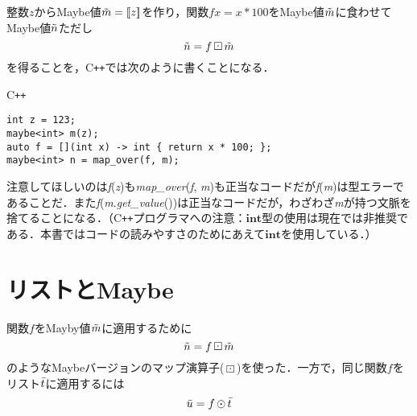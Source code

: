 \documentclass[a5paper,draft]{jsbook}
\def\[{\left[\!\left[}
\def\]{\right]\!\right]}
\newcommand{\programminglanguage}[1]{\textsf{#1}}
\newcommand{\cxx}{\programminglanguage{C}\texttt{++}}
\newenvironment{cxxcode}{\begin{itembox}[r]{\cxx}}{\end{itembox}}
\newcommand{\pthnClassname}[1]{\textrm{#1}}
\newcommand{\pthnId}[1]{\textit{#1}}
\newcommand{\pthnKeyword}[1]{\textbf{#1}}
\newcommand{\pthnOp}[1]{\texttt{#1}}
\newcommand{\mathListVar}[1]{\Bar{#1}}
\DeclareMathOperator{\hsklMap}{\odot}
\DeclareMathOperator{\hsklMaybeMap}{\boxdot}
\newcommand{\hsklJust}[1]{\[#1\]}
\newcommand{\hsklMaybe}[1]{\Tilde{#1}}
\begin{document}
整数$z$からMaybe値$\hsklMaybe{m}=\hsklJust{z}$を作り，関数$fx=x*100$をMaybe値$\hsklMaybe{m}$に食わせてMaybe値$\hsklMaybe{n}$ただし$$\hsklMaybe{n}=f\hsklMaybeMap\hsklMaybe{m}$$を得ることを，\cxx では次のように書くことになる．
\begin{cxxcode}
\begin{verbatim}
int z = 123;
maybe<int> m(z);
auto f = [](int x) -> int { return x * 100; };
maybe<int> n = map_over(f, m);
\end{verbatim}
\end{cxxcode}
注意してほしいのは\pthnId{f}(\pthnId{z})も\pthnId{map\_over}(\pthnId{f}, \pthnId{m})も正当なコードだが\pthnId{f}(\pthnId{m})は型エラーであることだ．また\pthnId{f}(\pthnId{m}.\pthnId{get\_value}())は正当なコードだが，わざわざ\pthnId{m}が持つ文脈を捨てることになる．（\cxx プログラマへの注意：$\pthnKeyword{int}$型の使用は現在では非推奨である．本書ではコードの読みやすさのためにあえて$\pthnKeyword{int}$を使用している．）


\section{リストとMaybe}

関数$f$をMayby値$\hsklMaybe{m}$に適用するために$$\hsklMaybe{n}=f\hsklMaybeMap\hsklMaybe{m}$$のようなMaybeバージョンのマップ演算子($\hsklMaybeMap$)を使った．一方で，同じ関数$f$をリスト$\mathListVar{t}$に適用するには$$\mathListVar{u}=f\hsklMap\mathListVar{t}$$
\end{document}
